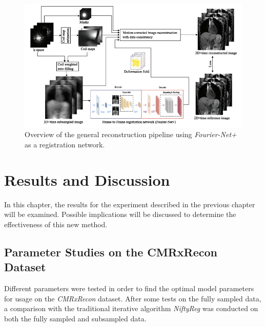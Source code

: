 \documentclass[english,version-2022-01]{uzl-thesis} %
\begin{document}
\begin{figure}[htpb]
	\centering
	\graphicspath{{images/}{\main/images/}}
	\includegraphics[width=\linewidth]{ReconstructionPipelineCompact.png} 
	\caption{Overview of the general reconstruction pipeline using \emph{Fourier-Net+} as a registration network.}
	\label{fig:ReconstructionPipeline}
\end{figure}



\chapter{Results and Discussion} \label{Ch:ResultsDiscussion}
In this chapter, the results for the experiment described in the previous chapter will be examined. Possible implications will be discussed to determine the effectiveness of this new method.



\section{Parameter Studies on the CMRxRecon Dataset} \label{Sec:ParameterStudies}
Different parameters were tested in order to find the optimal model parameters for usage on the \emph{CMRxRecon} dataset. After some tests on the fully sampled data, a comparison with the traditional iterative algorithm \emph{NiftyReg} was conducted on both the fully sampled and subsampled data.
\end{document}
